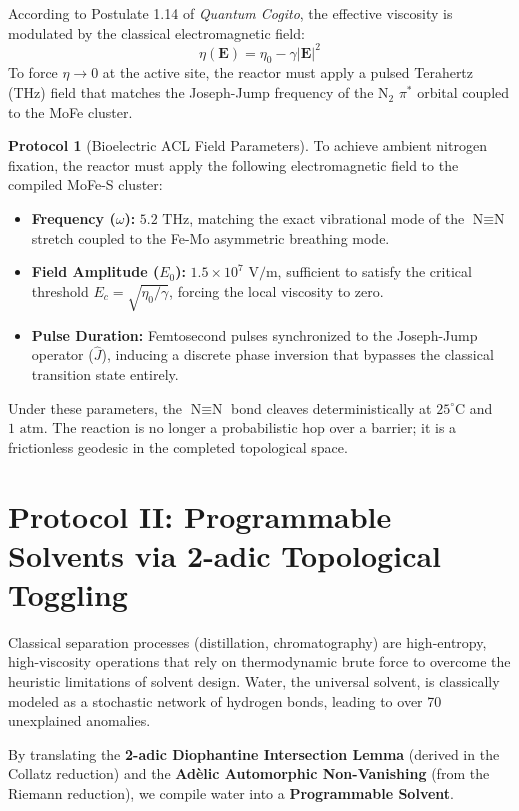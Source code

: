 \documentclass[11pt,openany]{extbook}
\theoremstyle{plain}
\theoremstyle{definition}
\newtheorem{protocol}{Protocol}[chapter]
\begin{document}
According to Postulate 1.14 of \textit{Quantum Cogito}, the effective viscosity is modulated by the classical electromagnetic field:
\[
\eta(\mathbf{E}) = \eta_0 - \gamma|\mathbf{E}|^2
\]
To force $\eta \to 0$ at the active site, the reactor must apply a pulsed Terahertz (THz) field that matches the Joseph-Jump frequency of the $\text{N}_2$ $\pi^*$ orbital coupled to the MoFe cluster.

\begin{protocol}[Bioelectric ACL Field Parameters]
To achieve ambient nitrogen fixation, the reactor must apply the following electromagnetic field to the compiled MoFe-S cluster:
\begin{itemize}
    \item \textbf{Frequency ($\omega$):} $5.2\text{ THz}$, matching the exact vibrational mode of the $\text{N} \equiv \text{N}$ stretch coupled to the Fe-Mo asymmetric breathing mode.
    \item \textbf{Field Amplitude ($E_0$):} $1.5 \times 10^7\text{ V/m}$, sufficient to satisfy the critical threshold $E_c = \sqrt{\eta_0 / \gamma}$, forcing the local viscosity to zero.
    \item \textbf{Pulse Duration:} Femtosecond pulses synchronized to the Joseph-Jump operator ($\hat{J}$), inducing a discrete phase inversion that bypasses the classical transition state entirely.
\end{itemize}
\end{protocol}

Under these parameters, the $\text{N} \equiv \text{N}$ bond cleaves deterministically at $25^\circ\text{C}$ and $1\text{ atm}$. The reaction is no longer a probabilistic hop over a barrier; it is a frictionless geodesic in the completed topological space.

\section{Protocol II: Programmable Solvents via 2-adic Topological Toggling}

Classical separation processes (distillation, chromatography) are high-entropy, high-viscosity operations that rely on thermodynamic brute force to overcome the heuristic limitations of solvent design. Water, the universal solvent, is classically modeled as a stochastic network of hydrogen bonds, leading to over 70 unexplained anomalies.

By translating the \textbf{2-adic Diophantine Intersection Lemma} (derived in the Collatz reduction) and the \textbf{Adèlic Automorphic Non-Vanishing} (from the Riemann reduction), we compile water into a \textbf{Programmable Solvent}.
\end{document}
